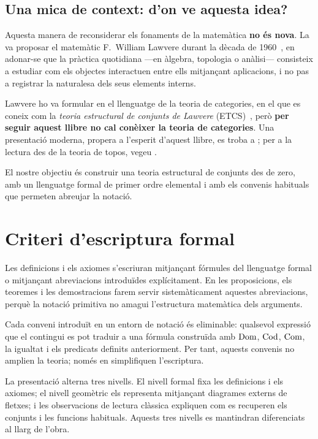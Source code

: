 \subsection*{Una mica de context: d'on ve aquesta idea?}

Aquesta manera de reconsiderar els fonaments de la matemàtica \textbf{no és
nova}. La va proposar el matemàtic F.~William Lawvere durant la dècada de
1960~\cite{lawvere1964}, en adonar-se que la pràctica quotidiana ---en àlgebra, topologia o
anàlisi--- consisteix a estudiar com els objectes interactuen entre ells
mitjançant aplicacions, i no pas a registrar la naturalesa dels seus
elements interns.

Lawvere ho va formular en el llenguatge de la teoria de categories, en el
que es coneix com la \emph{teoria estructural de conjunts de Lawvere}
(ETCS)~\cite{lawvere1964,lawvere-etcs-reprint}, però \textbf{per seguir aquest llibre no cal conèixer la teoria de categories}. Una presentació moderna, propera a l'esperit d'aquest llibre, es troba a \cite{lawvere-rosebrugh}; per a la lectura des de la teoria de topos, vegeu \cite{maclane-moerdijk}.

El nostre objectiu és construir una teoria estructural de conjunts des de zero, amb un llenguatge formal de primer ordre elemental i amb els convenis habituals que permeten abreujar la notació.


\section*{Criteri d'escriptura formal}\label{not:criteri-formal}
Les definicions i els axiomes s'escriuran mitjançant fórmules del llenguatge formal o mitjançant abreviacions introduïdes explícitament. En les proposicions, els teoremes i les demostracions farem servir sistemàticament aquestes abreviacions, perquè la notació primitiva no amagui l'estructura matemàtica dels arguments.

Cada conveni introduït en un entorn de notació és eliminable: qualsevol expressió que el contingui es pot traduir a una fórmula construïda amb \(\operatorname{Dom}\), \(\operatorname{Cod}\), \(\operatorname{Com}\), la igualtat i els predicats definits anteriorment. Per tant, aquests convenis no amplien la teoria; només en simplifiquen l'escriptura.

La presentació alterna tres nivells. El nivell formal fixa les definicions i els axiomes; el nivell geomètric els representa mitjançant diagrames externs de fletxes; i les observacions de lectura clàssica expliquen com es recuperen els conjunts i les funcions habituals. Aquests tres nivells es mantindran diferenciats al llarg de l'obra.
